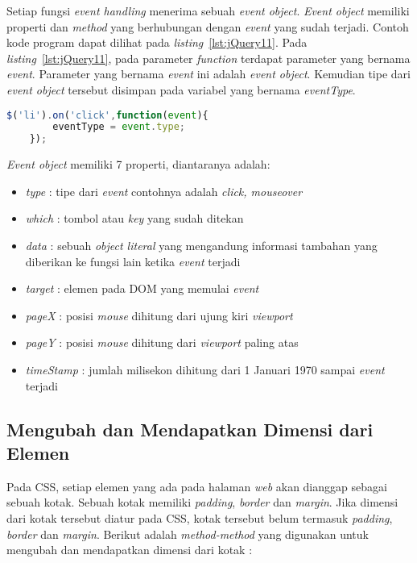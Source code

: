 Setiap fungsi \textit{event handling} menerima sebuah \textit{event object}. \textit{Event object} memiliki properti dan \textit{method} yang berhubungan dengan \textit{event} yang sudah terjadi. Contoh kode program dapat dilihat pada \textit{listing}~\ref{lst:jQuery11}. Pada \textit{listing}~\ref{lst:jQuery11}, pada parameter \textit{function} terdapat parameter yang bernama \textit{event}. Parameter yang bernama \textit{event} ini adalah \textit{event object}. Kemudian tipe dari \textit{event object} tersebut disimpan pada variabel yang bernama \textit{eventType}. 

\begin{lstlisting}[language=Javascript, caption=Mendapatkan tipe \textit{event} dari \textit{event object}, label={lst:jQuery11}]
	$('li').on('click',function(event){
		eventType = event.type;
	});
\end{lstlisting}

\textit{Event object} memiliki 7 properti, diantaranya adalah:

\begin{itemize}
	\item \textit{type} : tipe dari \textit{event} contohnya adalah \textit{click, mouseover}
	\item \textit{which} : tombol atau \textit{key} yang sudah ditekan
	\item \textit{data} : sebuah \textit{object literal} yang mengandung informasi tambahan yang diberikan ke fungsi lain ketika \textit{event} terjadi
	\item \textit{target} : elemen pada DOM yang memulai \textit{event}
	\item \textit{pageX} : posisi \textit{mouse} dihitung dari ujung kiri \textit{viewport} 
	\item \textit{pageY} : posisi \textit{mouse} dihitung dari \textit{viewport} paling atas
	\item \textit{timeStamp} : jumlah milisekon dihitung dari 1 Januari 1970 sampai \textit{event} terjadi
\end{itemize}

\subsection{Mengubah dan Mendapatkan Dimensi dari Elemen}
Pada CSS, setiap elemen yang ada pada halaman \textit{web} akan dianggap sebagai sebuah kotak. Sebuah kotak memiliki \textit{padding}, \textit{border} dan \textit{margin}. Jika dimensi dari kotak tersebut diatur pada CSS, kotak tersebut belum termasuk \textit{padding}, \textit{border} dan \textit{margin}.
Berikut adalah \textit{method-method} yang digunakan untuk mengubah dan mendapatkan dimensi dari kotak :

